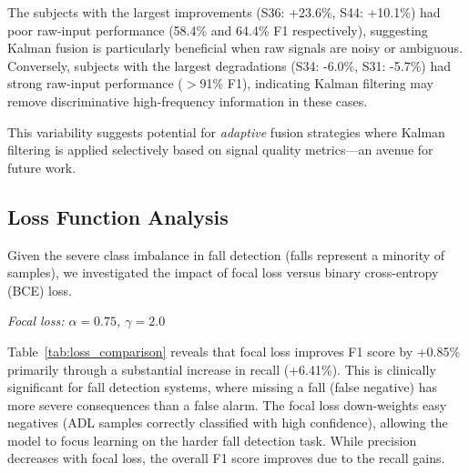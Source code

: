 The subjects with the largest improvements (S36: +23.6\%, S44: +10.1\%) had poor raw-input performance (58.4\% and 64.4\% F1 respectively), suggesting Kalman fusion is particularly beneficial when raw signals are noisy or ambiguous. Conversely, subjects with the largest degradations (S34: -6.0\%, S31: -5.7\%) had strong raw-input performance ($>$91\% F1), indicating Kalman filtering may remove discriminative high-frequency information in these cases.

This variability suggests potential for \textit{adaptive} fusion strategies where Kalman filtering is applied selectively based on signal quality metrics---an avenue for future work.

\subsection{Loss Function Analysis}
\label{sec:loss_analysis}

Given the severe class imbalance in fall detection (falls represent a minority of samples), we investigated the impact of focal loss versus binary cross-entropy (BCE) loss.

\begin{table}[htbp]
\centering
\caption{Loss Function Comparison on CNN-Mamba Architecture (21-fold LOSO-CV).}
\label{tab:loss_comparison}
\vspace{1mm}
\scriptsize
\textit{Focal loss: $\alpha=0.75$, $\gamma=2.0$}
\end{table}

Table~\ref{tab:loss_comparison} reveals that focal loss improves F1 score by +0.85\% primarily through a substantial increase in recall (+6.41\%). This is clinically significant for fall detection systems, where missing a fall (false negative) has more severe consequences than a false alarm. The focal loss down-weights easy negatives (ADL samples correctly classified with high confidence), allowing the model to focus learning on the harder fall detection task. While precision decreases with focal loss, the overall F1 score improves due to the recall gains.

